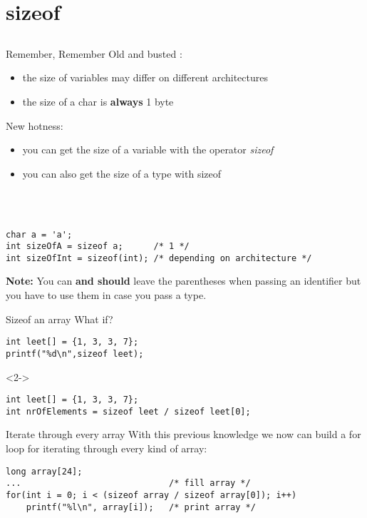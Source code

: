 \section{sizeof}
\subsection{}
\begin{frame}[fragile]{Remember, Remember}
	Old and busted	:
	\begin{itemize}
		\item the size of variables may differ on different architectures
		\item the size of a char is \textbf{always} 1 byte
	\end{itemize}
	New hotness:
	\begin{itemize}
		\item you can get the size of a variable with the operator \textit{sizeof}
		\item you can also get the size of a type with sizeof
	\end{itemize}\ \\\ \\
	\begin{lstlisting}[numbers=none]
char a = 'a';
int sizeOfA = sizeof a;		 /* 1 */
int sizeOfInt = sizeof(int); /* depending on architecture */
\end{lstlisting}
	\textbf{Note:} You can \textbf{and should} leave the parentheses when passing an identifier but you have to use them in case you pass a type.
\end{frame}
\begin{frame}[fragile]{Sizeof an array}
	What if?
	\begin{lstlisting}[numbers=none]
int leet[] = {1, 3, 3, 7};
printf("%d\n",sizeof leet);
\end{lstlisting}
	
	\begin{uncoverenv}<2->
		\begin{lstlisting}[numbers=none]
int leet[] = {1, 3, 3, 7};
int nrOfElements = sizeof leet / sizeof leet[0];
\end{lstlisting}
	\end{uncoverenv}
\end{frame}
\begin{frame}[fragile]{Iterate through every array}
	With this previous knowledge we now can build a for loop for iterating through every kind of array:
	\begin{lstlisting}[numbers=none]
long array[24];
...								/* fill array */
for(int i = 0; i < (sizeof array / sizeof array[0]); i++)
	printf("%l\n", array[i]);	/* print array */
\end{lstlisting}
\end{frame}
